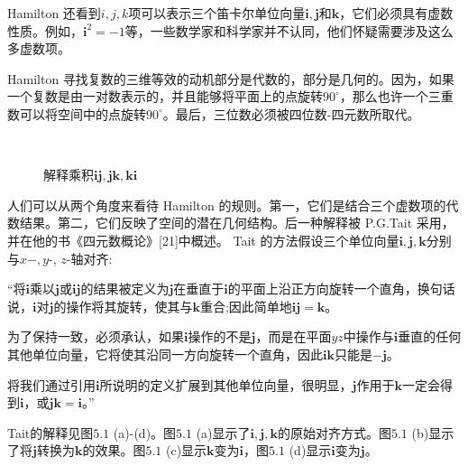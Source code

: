 Hamilton 还看到$i, j, k$项可以表示三个笛卡尔单位向量$\mathbf{i}, \mathbf{j}$和$\mathbf{k}$，它们必须具有虚数性质。例如，$\mathbf{i}^{2}=-1$等，一些数学家和科学家并不认同，他们怀疑需要涉及这么多虚数项。

Hamilton 寻找复数的三维等效的动机部分是代数的，部分是几何的。因为，如果一个复数是由一对数表示的，并且能够将平面上的点旋转$90^{\circ}$，那么也许一个三重数可以将空间中的点旋转$90^{\circ}$。最后，三位数必须被四位数-四元数所取代。

\begin{figure}[h!]
    \centering
    \\
    \caption[short]{解释乘积$\mathbf{i j}, \mathbf{j} \mathbf{k}, \mathbf{k i}$}
\end{figure}

人们可以从两个角度来看待 Hamilton 的规则。第一，它们是结合三个虚数项的代数结果。第二，它们反映了空间的潜在几何结构。后一种解释被 P.G.Tait 采用，并在他的书《四元数概论》[21]中概述。 Tait 的方法假设三个单位向量$\mathbf{i}, \mathbf{j}, \mathbf{k}$分别与$x-, y$-, $z$-轴对齐:

\begin{CJK}{UTF8}{gkai}
    “将$\mathbf{i}$乘以$\mathbf{j}$或$\mathbf{i} \mathbf{j}$的结果被定义为$\mathbf{j}$在垂直于$\mathbf{i}$的平面上沿正方向旋转一个直角，换句话说，$\mathbf{i}$对$\mathbf{j}$的操作将其旋转，使其与$\mathbf{k}$重合;因此简单地$\mathbf{i j}=\mathbf{k}$。

    为了保持一致，必须承认，如果$\mathbf{i}$操作的不是$\mathbf{j}$，而是在平面$ yz $中操作与$\mathbf{i}$垂直的任何其他单位向量，它将使其沿同一方向旋转一个直角，因此$\mathbf{i k}$只能是$-\mathbf{j}$。

    将我们通过引用$\mathbf{i}$所说明的定义扩展到其他单位向量，很明显，$\mathbf{j}$作用于$\mathbf{k}$一定会得到$\mathbf{i}$，或$\mathbf{j} \mathbf{k}=\mathbf{i}$。”
\end{CJK}

Tait的解释见图$5.1$ (a)-(d)。图$5.1$ (a)显示了$\mathbf{i}, \mathbf{j}, \mathbf{k}$的原始对齐方式。图$5.1$ (b)显示了将$\mathbf{j}$转换为$\mathbf{k}$的效果。图$5.1$ (c)显示$\mathbf{k}$变为$\mathbf{i}$，图$5.1$ (d)显示$\mathbf{i}$变为$\mathbf{j}$。


